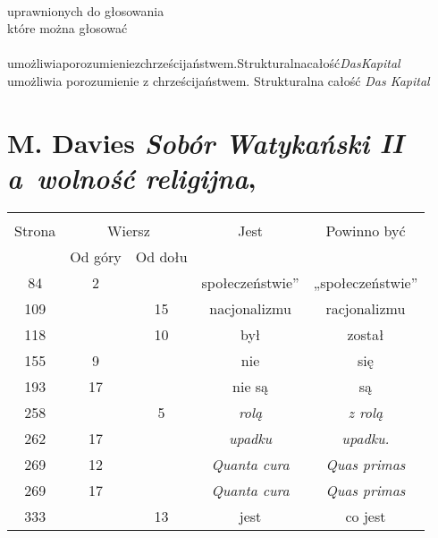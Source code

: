 \documentclass[a4paper,11pt]{article}
\numberwithin{equation}{section}
\begin{document}
\VerSpaceTwo


\noindent
{} \\
\Jest  uprawnionych do głosowania \\
\PowinnoByc które można głosować \\
 \\
\Jest  umożliwiaporozumieniezchrześcijaństwem.Strukturalnacałość\textit{DasKapital}
\\
\PowinnoByc umożliwia porozumienie z chrześcijaństwem. Strukturalna całość
\textit{Das Kapital} \\












\section{M. Davies \textit{Sobór Watykański II a~wolność
    religijna},
  \parencite{DaviesSoborAWolnoscReligina2002}}





\begin{center}

  \begin{tabular}{|c|c|c|c|c|}
    \hline
    & \multicolumn{2}{c|}{} & & \\
    Strona & \multicolumn{2}{c|}{Wiersz} & Jest
                              & Powinno być \\ \cline{2-3}
    & Od góry & Od dołu & & \\
    \hline
    \hphantom{0}84 & \hphantom{0}2 & & społeczeństwie” & „społeczeństwie” \\
    109 & & 15 & nacjonalizmu & racjonalizmu \\
    118 & & 10 & był & został \\
    155 & \hphantom{0}9 & & nie & się \\
    193 & 17 & & nie są & są \\
    258 & & \hphantom{0}5 & \textit{rolą} & \textit{z rolą} \\
    262 & 17 & & \textit{upadku} & \textit{upadku.} \\
    269 & 12 & & \textit{Quanta cura} & \textit{Quas primas} \\
    269 & 17 & & \textit{Quanta cura} & \textit{Quas primas} \\
    333 & & 13 & jest & co jest \\
    \hline
  \end{tabular}

\end{center}
\end{document}
